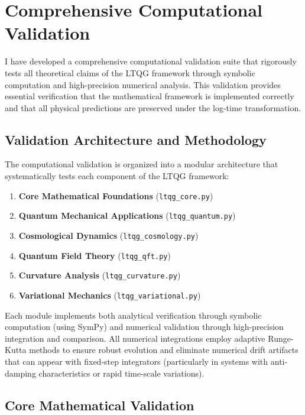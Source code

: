 \section{Comprehensive Computational Validation}
\label{sec:computational_validation}

I have developed a comprehensive computational validation suite that rigorously tests all theoretical claims of the LTQG framework through symbolic computation and high-precision numerical analysis. This validation provides essential verification that the mathematical framework is implemented correctly and that all physical predictions are preserved under the log-time transformation.

\subsection{Validation Architecture and Methodology}
\label{subsec:validation_architecture}

The computational validation is organized into a modular architecture that systematically tests each component of the LTQG framework:

\begin{enumerate}
\item \textbf{Core Mathematical Foundations} (\texttt{ltqg\_core.py})
\item \textbf{Quantum Mechanical Applications} (\texttt{ltqg\_quantum.py})
\item \textbf{Cosmological Dynamics} (\texttt{ltqg\_cosmology.py})
\item \textbf{Quantum Field Theory} (\texttt{ltqg\_qft.py})
\item \textbf{Curvature Analysis} (\texttt{ltqg\_curvature.py})
\item \textbf{Variational Mechanics} (\texttt{ltqg\_variational.py})
\end{enumerate}

Each module implements both analytical verification through symbolic computation (using SymPy) and numerical validation through high-precision integration and comparison. All numerical integrations employ adaptive Runge-Kutta methods to ensure robust evolution and eliminate numerical drift artifacts that can appear with fixed-step integrators (particularly in systems with anti-damping characteristics or rapid time-scale variations).

\subsection{Core Mathematical Validation}
\label{subsec:core_mathematical_validation}

